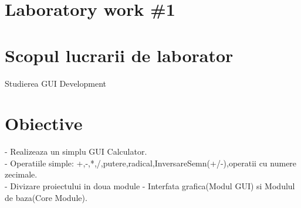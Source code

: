 \section*{Laboratory work \#1}

\section{Scopul lucrarii de laborator}
Studierea GUI Development
\section{Obiective}

- Realizeaza un simplu GUI Calculator.\\
\indent 
- Operatiile simple: +,-,*,/,putere,radical,InversareSemn(+/-),operatii cu numere zecimale.\\
\indent 
- Divizare proiectului in doua module - Interfata grafica(Modul GUI) si Modulul de baza(Core Module).

\clearpage
